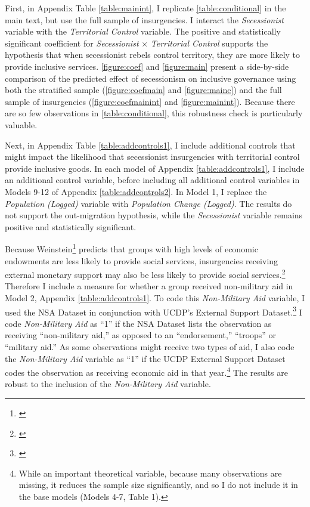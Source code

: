 \documentclass[12pt, letterpaper]{article}
\begin{document}
First, in Appendix Table \ref{table:mainint}, I replicate \autoref{table:conditional} in the main text, but use the full sample of insurgencies. I interact the \textit{Secessionist} variable with the \textit{Territorial Control} variable. The positive and statistically significant coefficient for \textit{Secessionist} $\times$ \textit{Territorial Control} supports the hypothesis that when secessionist rebels control territory, they are more likely to provide inclusive services. \autoref{figure:coef} and \autoref{figure:main} present a side-by-side comparison of the predicted effect of secessionism on inclusive governance using both the stratified sample (\autoref{figure:coefmain} and \autoref{figure:mainc}) and the full sample of insurgencies (\autoref{figure:coefmainint} and \autoref{figure:mainint}). Because there are so few observations in \autoref{table:conditional}, this robustness check is particularly valuable.




Next, in Appendix Table \ref{table:addcontrols1}, I include additional controls that might impact the likelihood that secessionist insurgencies with territorial control provide inclusive goods. In each model of Appendix \autoref{table:addcontrols1}, I include an additional control variable, before including all additional control variables in Models 9-12 of Appendix \autoref{table:addcontrols2}. In Model 1, I replace the \textit{Population (Logged)} variable with \textit{Population Change (Logged)}. The results do not support the out-migration hypothesis, while the \textit{Secessionist} variable remains positive and statistically significant. 

Because Weinstein\footnote{\citealt{weinstein2006inside}} predicts that groups with high levels of economic endowments are less likely to provide social services, insurgencies receiving external monetary support may also be less likely to provide social services.\footnote{\citealt{salehyan2014external}} Therefore I include a measure for whether a group received non-military aid in Model 2, Appendix \autoref{table:addcontrols1}. To code this \textit{Non-Military Aid} variable, I used the NSA Dataset in conjunction with UCDP's External Support Dataset.\footnote{\citealt{hogbladh2011external}} I code \textit{Non-Military Aid} as ``1'' if the NSA Dataset  lists the observation as receiving ``non-military aid,'' as opposed to an ``endorsement,'' ``troops'' or ``military aid.'' As some observations might receive two types of aid, I also code the \textit{Non-Military Aid} variable as  ``1'' if the UCDP External Support Dataset codes the observation as receiving economic aid in that year.\footnote{While an important theoretical variable, because many observations are missing, it reduces the sample size significantly, and so I do not include it in the base models (Models 4-7, Table 1).} The results are robust to the inclusion of the \textit{Non-Military Aid} variable. 
\end{document}
